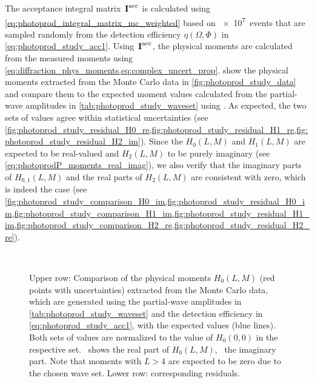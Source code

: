 The acceptance integral matrix~$\bm{\mathrm{I}}^\text{acc}$ is calculated
using \cref{eq:photoprod_integral_matrix_mc_weighted} based on \num{e7}~events
that are sampled randomly from the detection efficiency $\eta(\Omega,
\Phi)$ in \cref{eq:photoprod_study_acc1}.  Using~$\bm{\mathrm{I}}^\text{acc}$,
the physical moments are calculated from the measured moments using
\cref{eq:diffraction_phys_moments,eq:complex_uncert_prop}.
show the physical moments extracted from the Monte Carlo data in
\cref{fig:photoprod_study_data} and compare them to the expected
moment values calculated from the partial-wave amplitudes in
\cref{tab:photoprod_study_waveset} using
.
As expected, the two sets of values agree within statistical
uncertainties (see
\cref{fig:photoprod_study_residual_H0_re,fig:photoprod_study_residual_H1_re,fig:photoprod_study_residual_H2_im}).
Since the $H_0(L, M)$ and $H_1(L, M)$ are expected to be real-valued
and $H_2(L, M)$ to be purely imaginary (see
\cref{eq:photoprodP_moments_real_imag}), we also verify that the
imaginary parts of $H_{0, 1}(L, M)$ and the real parts of $H_2(L, M)$
are consistent with zero, which is indeed the case (see
\cref{fig:photoprod_study_comparison_H0_im,fig:photoprod_study_residual_H0_im,fig:photoprod_study_comparison_H1_im,fig:photoprod_study_residual_H1_im,fig:photoprod_study_comparison_H2_re,fig:photoprod_study_residual_H2_re}).

\begin{figure}[tbp]
  \centering%
  \\%
  \caption{Upper row: Comparison of the physical moments $H_0(L, M)$
  (red points with uncertainties) extracted from the Monte Carlo data,
  which are generated using the partial-wave amplitudes in
  \cref{tab:photoprod_study_waveset} and the detection efficiency in
  \cref{eq:photoprod_study_acc1}, with the expected values (blue
  lines).  Both sets of values are normalized to the value of $H_0(0,
  0)$ in the respective set.
  ~shows the real
  part of $H_0(L, M)$,
  ~the imaginary
  part.  Note that moments with $L > 4$ are expected to be zero due to
  the chosen wave set.  Lower row: corresponding residuals.}%
  \label{fig:photoprod_study_output_H0}%
\end{figure}

